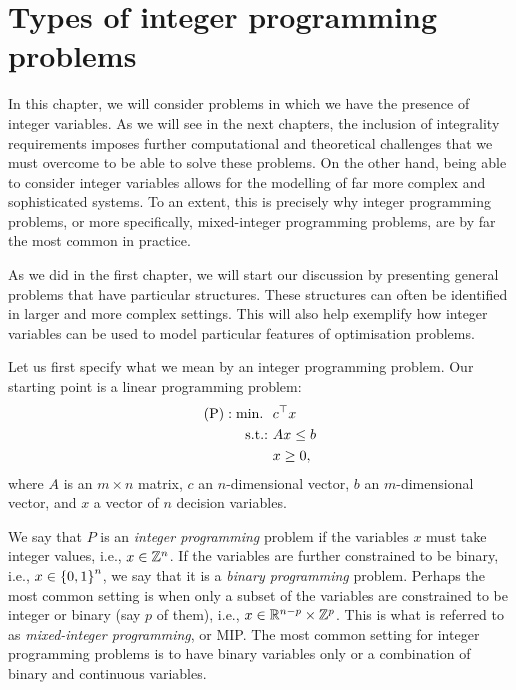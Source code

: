 \section{Types of integer programming problems}

In this chapter, we will consider problems in which we have the presence of integer variables. As we will see in the next chapters, the inclusion of integrality requirements imposes further computational and theoretical challenges that we must overcome to be able to solve these problems. On the other hand, being able to consider integer variables allows for the modelling of far more complex and sophisticated systems. To an extent, this is precisely why integer programming problems, or more specifically, mixed-integer programming problems, are by far the most common in practice.

As we did in the first chapter, we will start our discussion by presenting general problems that have particular structures. These structures can often be identified in larger and more complex settings. This will also help exemplify how integer variables can be used to model particular features of optimisation problems.

Let us first specify what we mean by an integer programming problem. Our starting point is a linear programming problem:
  \begin{align*}
	  \text{(P)} : \mathop{\text{min.~}} \ &c^\top x \\
	  \mathop{\text{s.t.:~}} & Ax \leq b \\
	  & x \geq 0,
  \end{align*}
  where $A$ is an $m \times n$ matrix, $c$ an $n$-dimensional vector, $b$ an $m$-dimensional vector, and $x$ a vector of $n$ decision variables. 
  
  We say that $P$ is an \emph{integer programming} problem if the variables $x$ must take integer values, i.e., $x \in \mathbb{Z}^n$. If the variables are further constrained to be binary, i.e., $x \in \left\{ 0,1 \right \}^n$, we say that it is a \emph{binary programming} problem. Perhaps the most common setting is when only a subset of the variables are constrained to be integer or binary (say $p$ of them), i.e., $x \in \mathbb{R}^{n-p} \times \mathbb{Z}^p$. This is what is referred to as \emph{mixed-integer programming}, or MIP. The most common setting for integer programming problems is to have binary variables only or a combination of binary and continuous variables. 
   
